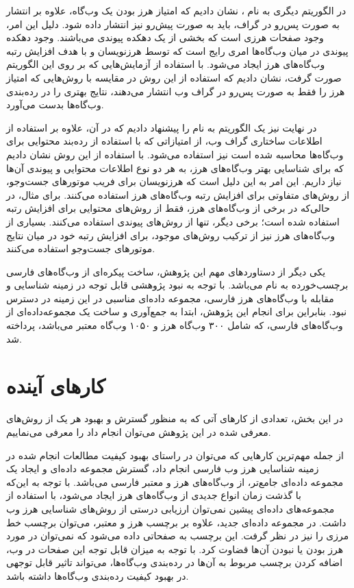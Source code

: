 \documentclass[twoside, a4paper,11pt]{book}
\numberwithin{equation}{chapter}
\numberwithin{table}{chapter}
\numberwithin{figure}{chapter}
\numberwithin{equation}{chapter}
\begin{document}
در الگوریتم دیگری به نام ، نشان دادیم که امتیاز هرز بودن یک وب‌گاه، علاوه بر انتشار به صورت پس‌رو در گراف، باید به صورت پیش‌رو نیز انتشار داده شود. دلیل این امر، وجود صفحات هرزی است که بخشی از یک دهکده پیوندی می‌باشند. وجود دهکده پیوندی در میان وب‌گاه‌ها امری رایج است که توسط هرزنویسان و با هدف افزایش رتبه وب‌گاه‌های هرز ایجاد می‌شود. با استفاده از آزمایش‌هایی که بر روی این الگوریتم صورت گرفت، نشان دادیم که استفاده از این روش در مقایسه با روش‌هایی که امتیاز هرز را فقط به صورت پس‌رو در گراف وب انتشار می‌دهند، نتایج بهتری را در رده‌بندی وب‌گاه‌ها بدست می‌آورد.

در نهایت نیز یک الگوریتم به نام  را پیشنهاد دادیم که در آن، علاوه بر استفاده از اطلاعات ساختاری گراف وب، از امتیازاتی که با استفاده از رده‌بند محتوایی برای وب‌گاه‌ها محاسبه شده است نیز استفاده می‌شود. با استفاده از این روش نشان دادیم که برای شناسایی بهتر وب‌گاه‌های هرز، به هر دو نوع اطلاعات محتوایی و پیوندی آن‌ها نیاز داریم. این امر به این دلیل است که هرزنویسان برای فریب موتورهای جست‌و‌جو، از روش‌های متفاوتی برای افزایش رتبه وب‌گاه‌های هرز استفاده می‌کنند. برای مثال، در حالی‌که در برخی از وب‌گاه‌های هرز، فقط از روش‌های محتوایی برای افزایش رتبه استفاده شده است؛ برخی دیگر، تنها از روش‌‌های پیوندی استفاده می‌کنند. بسیاری از وب‌گاه‌های هرز نیز از ترکیب روش‌های موجود، برای افزایش رتبه خود در میان نتایج موتورهای جست‌و‌جو استفاده می‌کنند.

یکی دیگر از دستاوردهای مهم این پژوهش، ساخت پیکره‌ای از وب‌گاه‌های فارسی برچسب‌خورده به نام  می‌باشد. با توجه به نبود پژوهشی قابل توجه در زمینه شناسایی و مقابله با وب‌گاه‌های هرز فارسی، مجموعه داده‌ای مناسبی در این زمینه در دسترس نبود. بنابراین برای انجام این پژوهش، ابتدا به جمع‌آوری و ساخت یک مجموعه‌داده‌ای از وب‌گاه‌های فارسی، که شامل ۳۰۰ وب‌گاه‌ هرز و ۱۰۵۰ وب‌گاه معتبر می‌باشد، پرداخته شد. 

\section{کارهای آینده}
در این بخش، تعدادی از کارهای آتی که به منظور گسترش و بهبود هر یک از روش‌های معرفی شده در این پژوهش می‌توان انجام داد را معرفی می‌نماییم.

از جمله مهم‌ترین کارهایی که می‌توان در راستای بهبود کیفیت مطالعات انجام شده در زمینه شناسایی هرز وب فارسی انجام داد، گسترش مجموعه‌ داده‌ای  و ایجاد یک مجموعه داده‌ای جامع‌تر، از وب‌گاه‌های هرز و معتبر فارسی می‌باشد. با توجه به این‌که با گذشت زمان انواع جدیدی از وب‌گاه‌های هرز ایجاد می‌شود، با استفاده از مجموعه‌های داده‌ای پیشین نمی‌توان ارزیابی درستی از روش‌های شناسایی هرز وب داشت. در مجموعه داده‌ای جدید، علاوه بر برچسب هرز و معتبر، می‌توان برچسب خط مرزی را نیز در نظر گرفت. این برچسب به صفحاتی داده می‌شود که نمی‌توان در مورد هرز بودن یا نبودن آن‌ها قضاوت کرد. با توجه به میزان قابل توجه این صفحات در وب، اضافه کردن برچسب مربوط به آن‌‌ها در رده‌بندی وب‌گاه‌ها، می‌تواند تاثیر قابل توجهی در بهبود کیفیت رده‌بندی وب‌گاه‌ها داشته باشد.
\end{document}
